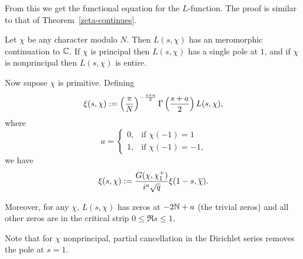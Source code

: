 From this we get the functional equation for the $L$-function. The proof is similar to that of Theorem~\ref{zeta-continues}.
\begin{thm}
Let $\chi$ be any character modulo $N$. 
Then $L(s,\chi)$ has an meromorphic continuation to $\mathbb{C}$. If $\chi$ is principal then $L(s,\chi)$ has a single pole %
at $1$, and if $\chi$ is nonprincipal then $L(s,\chi)$ is entire. 

Now supose $\chi$ is primitive. Defining
\[
\xi(s,\chi):=\left( {\frac{\pi}{N}} \right)^{-\frac{s+a}{2}}\Gamma\left( {\frac{s+a}{2}} \right) L(s,\chi),
\]
where
\[
a=\begin{cases}
0,&\text{if $\chi(-1)=1$}\\
1,&\text{if $\chi(-1)=-1$,}
\end{cases}
\]
we have
\[
\xi(s,\chi):=\frac{G(\chi,\chi^+_1)}{i^a\sqrt q}\xi(1-s,\overline{\chi}).
\]

Moreover, for any $\chi$, $L(s,\chi)$ has zeros at $-2\mathbb{N}+a$ (the trivial zeros) and all other zeros are in the critical strip $0\le \Re s\le 1$.
\end{thm}
Note that for $\chi$ nonprincipal, partial cancellation in the Dirichlet series removes the pole at $s=1$.
